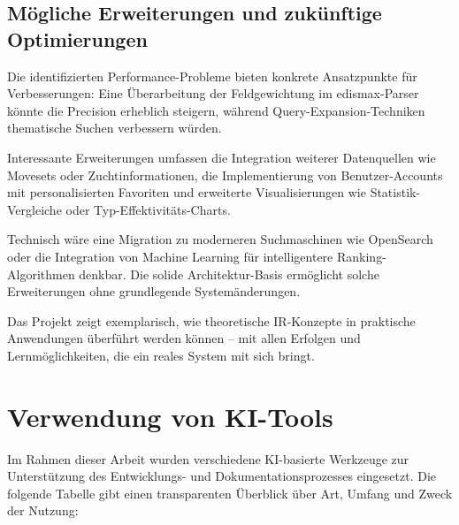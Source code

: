 \subsection{Mögliche Erweiterungen und zukünftige Optimierungen}
\label{sec:fazit_ausblick}

Die identifizierten Performance-Probleme bieten konkrete Ansatzpunkte für Verbesserungen: Eine Überarbeitung der Feldgewichtung im edismax-Parser könnte die Precision erheblich steigern, während Query-Expansion-Techniken thematische Suchen verbessern würden.

Interessante Erweiterungen umfassen die Integration weiterer Datenquellen wie Movesets oder Zuchtinformationen, die Implementierung von Benutzer-Accounts mit personalisierten Favoriten und erweiterte Visualisierungen wie Statistik-Vergleiche oder Typ-Effektivitäts-Charts.

Technisch wäre eine Migration zu moderneren Suchmaschinen wie OpenSearch oder die Integration von Machine Learning für intelligentere Ranking-Algorithmen denkbar. Die solide Architektur-Basis ermöglicht solche Erweiterungen ohne grundlegende Systemänderungen.

Das Projekt zeigt exemplarisch, wie theoretische IR-Konzepte in praktische Anwendungen überführt werden können – mit allen Erfolgen und Lernmöglichkeiten, die ein reales System mit sich bringt.




\appendix %

\section{Verwendung von KI-Tools}
\label{app:ai_tools}

Im Rahmen dieser Arbeit wurden verschiedene KI-basierte Werkzeuge zur Unterstützung des Entwicklungs- und Dokumentationsprozesses eingesetzt. Die folgende Tabelle gibt einen transparenten Überblick über Art, Umfang und Zweck der Nutzung:

